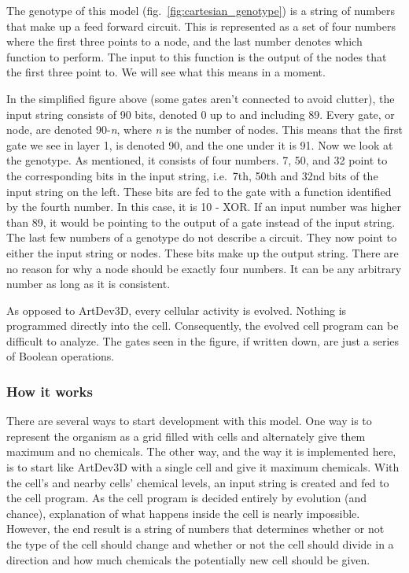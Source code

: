 The genotype of this model (fig.~\ref{fig:cartesian_genotype}) is a string of numbers that make up a feed forward circuit. This is represented as a set of four numbers where the first three points to a node, and the last number denotes which function to perform. The input to this function is the output of the nodes that the first three point to. We will see what this means in a moment.

In the simplified figure above (some gates aren't connected to avoid clutter), the input string consists of 90 bits, denoted 0 up to and including 89. Every gate, or node, are denoted 90-\emph{n}, where \emph{n} is the number of nodes. This means that the first gate we see in layer 1, is denoted 90, and the one under it is 91. Now we look at the genotype. As mentioned, it consists of four numbers. 7, 50, and 32 point to the corresponding bits in the input string, i.e.\ 7th, 50th and 32nd bits of the input string on the left. These bits are fed to the gate with a function identified by the fourth number. In this case, it is 10 - XOR. If an input number was higher than 89, it would be pointing to the output of a gate instead of the input string. The last few numbers of a genotype do not describe a circuit. They now point to either the input string or nodes. These bits make up the output string. There are no reason for why a node should be exactly four numbers. It can be any arbitrary number as long as it is consistent.

As opposed to ArtDev3D, every cellular activity is evolved. Nothing is programmed directly into the cell. Consequently, the evolved cell program can be difficult to analyze. The gates seen in the figure, if written down, are just a series of Boolean operations.

\subsubsection{How it works}
There are several ways to start development with this model. One way is to represent the organism as a grid filled with cells and alternately give them maximum and no chemicals. The other way, and the way it is implemented here, is to start like ArtDev3D with a single cell and give it maximum chemicals. With the cell's and nearby cells' chemical levels, an input string is created and fed to the cell program. As the cell program is decided entirely by evolution (and chance), explanation of what happens inside the cell is nearly impossible. However, the end result is a string of numbers that determines whether or not the type of the cell should change and whether or not the cell should divide in a direction and how much chemicals the potentially new cell should be given.


